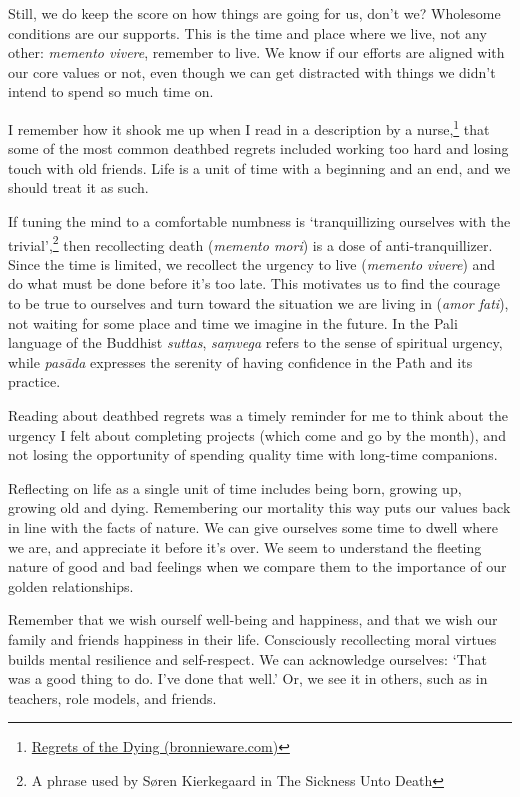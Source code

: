 Still, we do keep the score on how things are going for us, don't we?
Wholesome conditions are our supports. This is the time and place where
we live, not any other: \emph{memento vivere}, remember to live. We know
if our efforts are aligned with our core values or not, even though we
can get distracted with things we didn't intend to spend so much time
on.

I remember how it shook me up when I read in a description by a
nurse,\footnote{\href{https://bronnieware.com/blog/regrets-of-the-dying/}{Regrets
  of the Dying (bronnieware.com)}} that some of the most common deathbed
regrets included working too hard and losing touch with old friends.
Life is a unit of time with a beginning and an end, and we should treat
it as such.


If tuning the mind to a comfortable numbness is `tranquillizing
ourselves with the trivial',\footnote{A phrase used by Søren Kierkegaard
  in The Sickness Unto Death} then recollecting death (\emph{memento
mori}) is a dose of anti-tranquillizer. Since the time is limited, we
recollect the urgency to live (\emph{memento vivere}) and do what must
be done before it's too late. This motivates us to find the courage to
be true to ourselves and turn toward the situation we are living in
(\emph{amor fati}), not waiting for some place and time we imagine in
the future. In the Pali language of the Buddhist \emph{suttas},
\emph{saṃvega} refers to the sense of spiritual urgency, while
\emph{pasāda} expresses the serenity of having confidence in the Path
and its practice.

Reading about deathbed regrets was a timely reminder for me to think
about the urgency I felt about completing projects (which come and go by
the month), and not losing the opportunity of spending quality time with
long-time companions.

Reflecting on life as a single unit of time includes being born, growing
up, growing old and dying. Remembering our mortality this way puts our
values back in line with the facts of nature. We can give ourselves some
time to dwell where we are, and appreciate it before it's over. We seem
to understand the fleeting nature of good and bad feelings when we
compare them to the importance of our golden relationships.

Remember that we wish ourself well-being and happiness, and that we wish
our family and friends happiness in their life. Consciously recollecting
moral virtues builds mental resilience and self-respect. We can
acknowledge ourselves: `That was a good thing to do. I've done that
well.' Or, we see it in others, such as in teachers, role models, and
friends.

